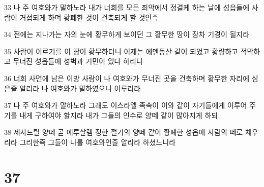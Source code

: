 \par 33 나 주 여호와가 말하노라 내가 너희를 모든 죄악에서 정결케 하는 날에 성읍들에 사람이 거접되게 하며 황폐한 것이 건축되게 할 것인즉
\par 34 전에는 지나가는 자의 눈에 황무하게 보이던 그 황무한 땅이 장차 기경이 될지라
\par 35 사람이 이르기를 이 땅이 황무하더니 이제는 에덴동산 같이 되었고 황량하고 적막하고 무너진 성읍들에 성벽과 거민이 있다 하리니
\par 36 너희 사면에 남은 이방 사람이 나 여호와가 무너진 곳을 건축하며 황무한 자리에 심은줄 알리라 나 여호와가 말하였으니 이루리라
\par 37 나 주 여호와가 말하노라 그래도 이스라엘 족속이 이와 같이 자기들에게 이루어 주기를 내게 구하여야 할지라 내가 그들의 인수로 양떼 같이 많아지게 하되
\par 38 제사드릴 양떼 곧 예루살렘 정한 절기의 양떼 같이 황폐한 성읍에 사람의 떼로 채우리라 그리한즉 그들이 나를 여호와인줄 알리라 하셨느니라

\chapter{37}

